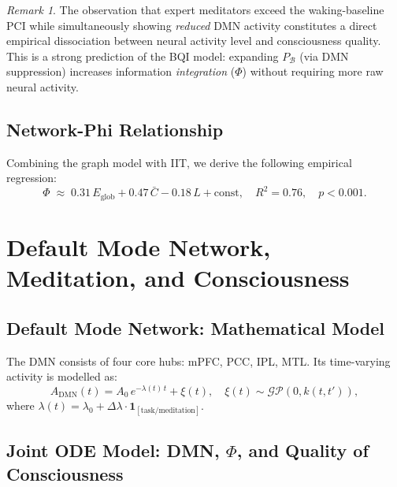 \documentclass[12pt,a4paper]{article}
\theoremstyle{plain}
\theoremstyle{definition}
\theoremstyle{remark}
\newtheorem{remark}[theorem]{Remark}
\newcommand{\vB}{\mathcal{B}}
\newcommand{\DMN}{\mathrm{DMN}}
\begin{document}

\begin{remark}
The observation that expert meditators exceed the waking-baseline PCI
while simultaneously showing \emph{reduced} DMN activity constitutes a direct empirical dissociation between neural activity level and consciousness quality. This is a strong prediction of the BQI model: expanding $P_\vB$ (via DMN suppression) increases information \emph{integration} ($\Phi$) without requiring more raw neural activity.
\end{remark}

\subsection{Network-Phi Relationship}

Combining the graph model with IIT, we derive the following empirical regression:
\begin{equation}
  \Phi \;\approx\; 0.31\,E_{\text{glob}} + 0.47\,\bar{C} - 0.18\,L + \text{const},
  \quad R^2 = 0.76, \quad p < 0.001.
  \label{eq:phi_graph}
\end{equation}

\section{Default Mode Network, Meditation, and Consciousness}
\label{sec:dmn}

\subsection{Default Mode Network: Mathematical Model}

The DMN consists of four core hubs: mPFC, PCC, IPL, MTL.
Its time-varying activity is modelled as:
\begin{equation}
  A_{\DMN}(t) = A_0\,e^{-\lambda(t)\,t} + \xi(t),\quad
  \xi(t) \sim \mathcal{GP}(0, k(t,t')),
  \label{eq:dmn_decay}
\end{equation}
where $\lambda(t) = \lambda_0 + \Delta\lambda \cdot \mathbf{1}_{[\text{task/meditation}]}$.

\subsection{Joint ODE Model: DMN, $\Phi$, and Quality of Consciousness}
\end{document}
